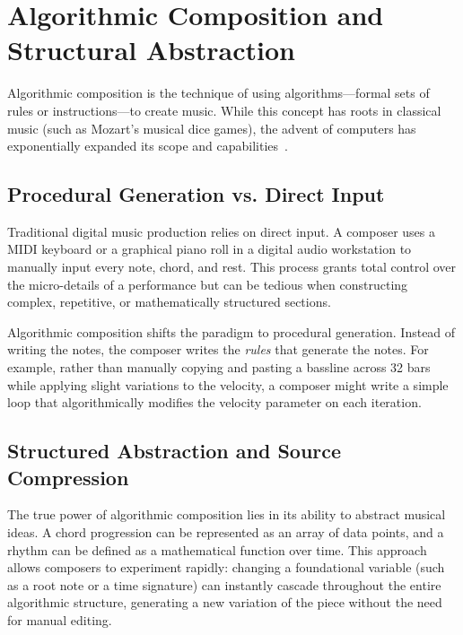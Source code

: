 \section{Algorithmic Composition and Structural Abstraction}\label{sec:algorithmic-composition}

Algorithmic composition is the technique of using algorithms---formal sets of rules or instructions---to create music.
While this concept has roots in classical music (such as Mozart's musical dice games), the advent of computers has
exponentially expanded its scope and capabilities~\cite{Nierhaus_2009}.

\subsection{Procedural Generation vs. Direct Input}\label{detail-subsec:procedural-generation-vs.-direct-input}

Traditional digital music production relies on direct input.
A composer uses a MIDI keyboard or a graphical piano roll in a digital audio workstation to manually input every
note, chord, and rest.
This process grants total control over the micro-details of a performance but can be tedious when constructing complex,
repetitive, or mathematically structured sections.

Algorithmic composition shifts the paradigm to procedural generation.
Instead of writing the notes, the composer writes the \textit{rules} that generate the notes.
For example, rather than manually copying and pasting a bassline across 32 bars while applying slight variations to the
velocity, a composer might write a simple loop that algorithmically modifies the velocity parameter on each iteration.

\subsection{Structured Abstraction and Source Compression}\label{detail-subsec:structured-abstraction}

The true power of algorithmic composition lies in its ability to abstract musical ideas.
A chord progression can be represented as an array of data points, and a rhythm can be defined as a mathematical
function over time.
This approach allows composers to experiment rapidly: changing a foundational variable (such as a root note or a time
signature) can instantly cascade throughout the entire algorithmic structure, generating a new variation of
the piece without the need for manual editing.

